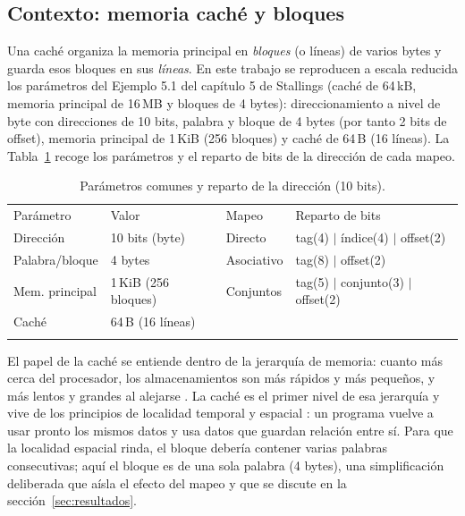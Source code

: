\documentclass[llncs]{llncs}
\begin{document}
\subsection{Contexto: memoria caché y bloques}

Una caché organiza la memoria principal en \emph{bloques} (o
líneas) de varios bytes y guarda esos bloques en sus \emph{líneas}.
En este trabajo se reproducen a escala reducida los parámetros del
Ejemplo 5.1 del capítulo 5 de Stallings \cite{stallings2019} (caché de
64\,kB, memoria principal de 16\,MB y bloques de 4 bytes):
direccionamiento a nivel de byte
con direcciones de 10 bits, palabra y bloque de 4 bytes (por tanto 2
bits de offset), memoria principal de 1\,KiB (256 bloques) y caché de
64\,B (16 líneas). La Tabla~\ref{tab:par} recoge los parámetros y el
reparto de bits de la dirección de cada mapeo.

\begin{table}[t]
\centering
\caption{Parámetros comunes y reparto de la dirección (10 bits).}
\label{tab:par}
\small
\begin{tabular}{llll}
\hline\noalign{\smallskip}
Parámetro & Valor & Mapeo & Reparto de bits\\
\noalign{\smallskip}\hline\noalign{\smallskip}
Dirección & 10 bits (byte) & Directo & tag(4) $\vert$ índice(4) $\vert$ offset(2)\\
Palabra/bloque & 4 bytes & Asociativo & tag(8) $\vert$ offset(2)\\
Mem. principal & 1\,KiB (256 bloques) & Conjuntos & tag(5) $\vert$ conjunto(3) $\vert$ offset(2)\\
Caché & 64\,B (16 líneas) & & \\
\noalign{\smallskip}\hline
\end{tabular}
\end{table}

El papel de la caché se entiende dentro de la jerarquía de memoria:
cuanto más cerca del procesador, los almacenamientos son más rápidos y
más pequeños, y más lentos y grandes al alejarse
\cite{tanenbaum2013,hamacher2002,wikipedia-locality}. La caché es el primer nivel
de esa jerarquía y vive de los principios de localidad temporal y
espacial \cite{wikipedia-locality,stallings2019,smith1982}: un programa vuelve
a usar pronto los mismos datos y usa datos que guardan relación entre
sí. Para que la localidad espacial rinda, el bloque debería contener
varias palabras consecutivas; aquí el bloque es de una sola palabra
(4 bytes), una simplificación deliberada que aísla el efecto del
mapeo y que se discute en la sección~\ref{sec:resultados}.
\end{document}
